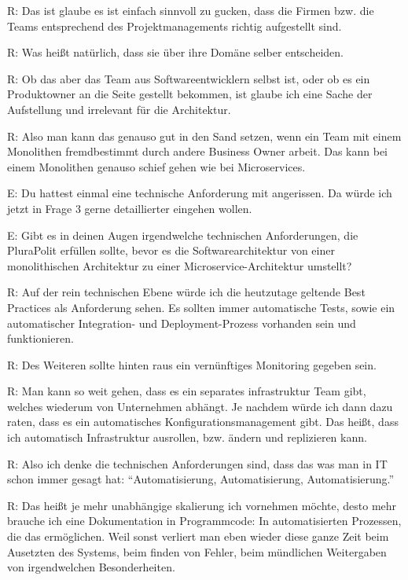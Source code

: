 \label{appendix:r-22}
R: Das ist glaube es ist einfach sinnvoll zu gucken, dass die Firmen bzw. die Teams entsprechend des Projektmanagements richtig aufgestellt sind.

\label{appendix:r-23}
R: Was heißt natürlich, dass sie über ihre Domäne selber entscheiden.

\label{appendix:r-24}
R: Ob das aber das Team aus Softwareentwicklern selbst ist, oder ob es ein  Produktowner an die Seite gestellt bekommen, ist glaube ich eine Sache der Aufstellung und irrelevant für die Architektur.

\label{appendix:r-25}
R: Also man kann das genauso gut in den Sand setzen, wenn ein Team mit einem Monolithen  fremdbestimmt durch andere Business Owner arbeit. Das kann bei einem Monolithen genauso schief gehen wie bei Microservices.

E: Du hattest einmal eine technische Anforderung mit angerissen. Da würde ich jetzt in Frage 3 gerne detaillierter eingehen wollen. 

E: Gibt es in deinen Augen irgendwelche technischen Anforderungen, die PluraPolit erfüllen sollte, bevor es die Softwarearchitektur von einer monolithischen Architektur zu einer Microservice-Architektur umstellt? 

\label{appendix:r-26} \label{appendix:r-27}
R: Auf der rein technischen Ebene würde ich die heutzutage geltende Best Practices als Anforderung sehen. Es sollten immer automatische Tests, sowie ein automatischer Integration- und Deployment-Prozess vorhanden sein und funktionieren.

\label{appendix:r-28}
R: Des Weiteren sollte hinten raus ein vernünftiges Monitoring gegeben sein.

R: Man kann so weit gehen, dass es ein separates infrastruktur Team gibt, welches wiederum von Unternehmen abhängt. Je nachdem würde ich dann dazu raten, dass es ein automatisches Konfigurationsmanagement gibt. Das heißt, dass ich automatisch Infrastruktur ausrollen, bzw. ändern und replizieren kann.

\label{appendix:r-29}
R: Also ich denke die technischen Anforderungen sind, dass das was man in IT schon immer gesagt hat:  “Automatisierung, Automatisierung, Automatisierung.”

\label{appendix:r-30}
R: Das heißt je mehr unabhängige skalierung ich vornehmen möchte, desto mehr brauche ich eine Dokumentation in Programmcode: In automatisierten Prozessen, die das ermöglichen.
Weil sonst verliert man eben wieder diese ganze Zeit beim Ausetzten des Systems, beim finden von Fehler, beim mündlichen Weitergaben von irgendwelchen Besonderheiten. 

